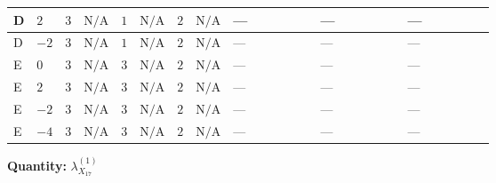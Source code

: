 \documentclass[8pt]{article}
\begin{document}
\begin{landscape}
\begin{longtable}{@{}llcccccc >{\raggedright\arraybackslash}p{0.21\linewidth} >{\raggedright\arraybackslash}p{0.21\linewidth} >{\raggedright\arraybackslash}p{0.21\linewidth}@{}}
D & $2$ & $3$ & $\text{N/A}$ & $1$ & $\text{N/A}$ & $2$ & $\text{N/A}$ & --- & --- & --- \\
\midrule
D & $-2$ & $3$ & $\text{N/A}$ & $1$ & $\text{N/A}$ & $2$ & $\text{N/A}$ & --- & --- & --- \\
\midrule
E & $0$ & $3$ & $\text{N/A}$ & $3$ & $\text{N/A}$ & $2$ & $\text{N/A}$ & --- & --- & --- \\
\midrule
E & $2$ & $3$ & $\text{N/A}$ & $3$ & $\text{N/A}$ & $2$ & $\text{N/A}$ & --- & --- & --- \\
\midrule
E & $-2$ & $3$ & $\text{N/A}$ & $3$ & $\text{N/A}$ & $2$ & $\text{N/A}$ & --- & --- & --- \\
\midrule
E & $-4$ & $3$ & $\text{N/A}$ & $3$ & $\text{N/A}$ & $2$ & $\text{N/A}$ & --- & --- & --- \\
\midrule
\bottomrule
\end{longtable}
\clearpage
\noindent\textbf{Quantity: }${\lambda_{X_{17}}^{(1)}}$\par\smallskip

\end{landscape}
\end{document}
